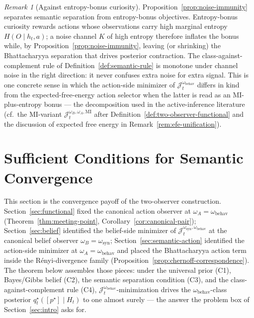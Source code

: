 \documentclass[11pt]{article}
\theoremstyle{definition}
\theoremstyle{remark}
\newtheorem{remark}[theorem]{Remark}
\begin{document}
\begin{remark}[Against entropy-bonus curiosity]
\label{rem:against-entropy-bonus}
Proposition~\ref{prop:noise-immunity} separates semantic separation from entropy-bonus objectives. Entropy-bonus curiosity rewards actions whose observations carry high marginal entropy $H(O\mid h_t,a)$; a noise channel $K$ of high entropy therefore inflates the bonus while, by Proposition~\ref{prop:noise-immunity}, leaving (or shrinking) the Bhattacharyya separation that drives posterior contraction. The class-against-complement rule of Definition~\ref{def:semantic-rule} is monotone under channel noise in the right direction: it never confuses extra noise for extra signal. This is one concrete sense in which the action-side minimizer of $\mathcal J_t^{\omega_{\mathrm{behav}}}$ differs in kind from the expected-free-energy action selector when the latter is read as an MI-plus-entropy bonus --- the decomposition used in the active-inference literature (cf.\ the MI-variant $\mathcal J_t^{\omega_B,\omega_A,\mathrm{MI}}$ after Definition~\ref{def:two-observer-functional} and the discussion of expected free energy in Remark~\ref{rem:efe-unification}).
\end{remark}

\section{Sufficient Conditions for Semantic Convergence}
\label{sec:main}

This section is the convergence payoff of the two-observer construction. Section~\ref{sec:functional} fixed the canonical action observer at $\omega_A=\omega_{\mathrm{behav}}$ (Theorem~\ref{thm:meeting-point}, Corollary~\ref{cor:canonical-pair}); Section~\ref{sec:belief} identified the belief-side minimizer of $\mathcal J_t^{\omega_{\mathrm{syn}},\omega_{\mathrm{behav}}}$ at the canonical belief observer $\omega_B=\omega_{\mathrm{syn}}$; Section~\ref{sec:semantic-action} identified the action-side minimizer at $\omega_A=\omega_{\mathrm{behav}}$ and placed the Bhattacharyya action term inside the R\'enyi-divergence family (Proposition~\ref{prop:chernoff-correspondence}). The theorem below assembles those pieces: under the universal prior (C1), Bayes/Gibbs belief (C2), the semantic separation condition (C3), and the class-against-complement rule (C4), $\mathcal J_t^{\omega_{\mathrm{behav}}}$-minimization drives the $\omega_{\mathrm{behav}}$-class posterior $q_t^\star([p^\star]\mid H_t)$ to one almost surely --- the answer the problem box of Section~\ref{sec:intro} asks for.
\end{document}
